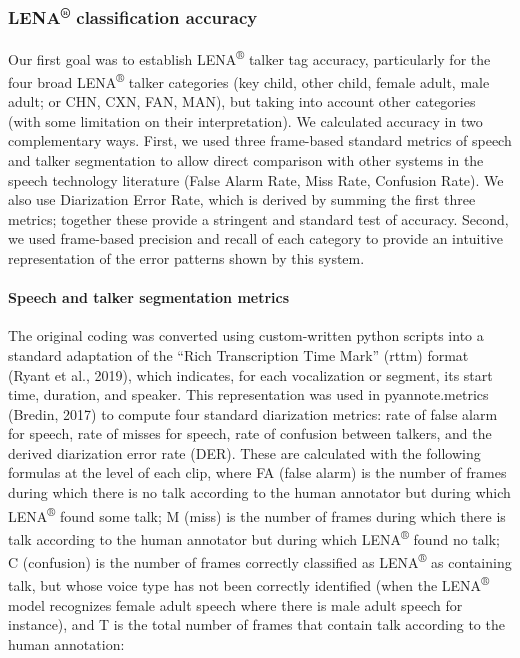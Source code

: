 \documentclass[english,floatsintext,man]{apa6}
\begin{document}
\subsubsection{\texorpdfstring{LENA\textsuperscript{®} classification
accuracy}{LENA® classification accuracy}}\label{lena-classification-accuracy}

Our first goal was to establish LENA\textsuperscript{®} talker tag
accuracy, particularly for the four broad LENA\textsuperscript{®} talker
categories (key child, other child, female adult, male adult; or CHN,
CXN, FAN, MAN), but taking into account other categories (with some
limitation on their interpretation). We calculated accuracy in two
complementary ways. First, we used three frame-based standard metrics of
speech and talker segmentation to allow direct comparison with other
systems in the speech technology literature (False Alarm Rate, Miss
Rate, Confusion Rate). We also use Diarization Error Rate, which is
derived by summing the first three metrics; together these provide a
stringent and standard test of accuracy. Second, we used frame-based
precision and recall of each category to provide an intuitive
representation of the error patterns shown by this system.

\paragraph{Speech and talker segmentation
metrics}\label{speech-and-talker-segmentation-metrics}

The original coding was converted using custom-written python scripts
into a standard adaptation of the \enquote{Rich Transcription Time Mark}
(rttm) format (Ryant et al., 2019), which indicates, for each
vocalization or segment, its start time, duration, and speaker. This
representation was used in pyannote.metrics (Bredin, 2017) to compute
four standard diarization metrics: rate of false alarm for speech, rate
of misses for speech, rate of confusion between talkers, and the derived
diarization error rate (DER). These are calculated with the following
formulas at the level of each clip, where FA (false alarm) is the number
of frames during which there is no talk according to the human annotator
but during which LENA\textsuperscript{®} found some talk; M (miss) is
the number of frames during which there is talk according to the human
annotator but during which LENA\textsuperscript{®} found no talk; C
(confusion) is the number of frames correctly classified as
LENA\textsuperscript{®} as containing talk, but whose voice type has not
been correctly identified (when the LENA\textsuperscript{®} model
recognizes female adult speech where there is male adult speech for
instance), and T is the total number of frames that contain talk
according to the human annotation:
\end{document}
